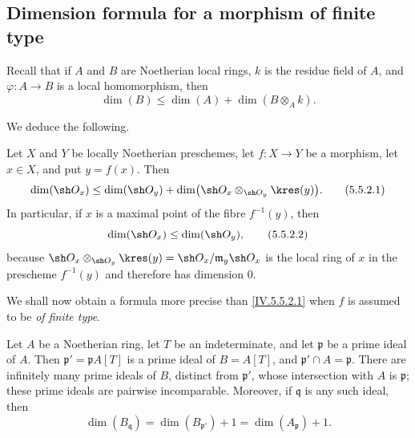 \subsection{Dimension formula for a morphism of finite type}
\label{subsection:IV.5.5}
\label{IV.5.5}

\begin{env}[5.5.1]
\label{IV.5.5.1}


Recall  that if $A$ and $B$ are Noetherian local
rings, $k$ is the residue field of $A$, and
$\varphi:A\to B$ is a local homomorphism, then
\begin{equation}
\dim(B)\leq\dim(A)+\dim(B\otimes_A k).
\tag{5.5.1.1}\label{IV.5.5.1.1}
\end{equation}
\end{env}

We deduce the following.

\begin{proposition}[5.5.2]
\label{IV.5.5.2}
Let $X$ and $Y$ be locally Noetherian preschemes, let
$f:X\to Y$ be a morphism, let $x\in X$, and put $y=f(x)$.
Then
\begin{equation}
\dim(\sh O_x)
 \leq\dim(\sh O_y)
   +\dim\bigl(\sh O_x\otimes_{\sh O_y}\kres(y)\bigr).
\tag{5.5.2.1}\label{IV.5.5.2.1}
\end{equation}
In particular, if $x$ is a maximal point of the fibre $f^{-1}(y)$,
then
\begin{equation}
\dim(\sh O_x)\leq\dim(\sh O_y),
\tag{5.5.2.2}\label{IV.5.5.2.2}
\end{equation}
because $\sh O_x\otimes_{\sh O_y}\kres(y)
=\sh O_x/\mathfrak m_y\sh O_x$
is the local ring of $x$ in the prescheme $f^{-1}(y)$ and therefore
has dimension $0$.
\end{proposition}


We shall now obtain a formula more precise than
\eqref{IV.5.5.2.1} when $f$ is assumed to be \emph{of finite type}.

\begin{proposition}[5.5.3]
\label{IV.5.5.3}
Let $A$ be a Noetherian ring, let $T$ be an indeterminate, and let
$\mathfrak p$ be a prime ideal of $A$.
Then $\mathfrak p'=\mathfrak pA[T]$
is a prime ideal of $B=A[T]$, and
$\mathfrak p'\cap A=\mathfrak p$.
There are infinitely many prime ideals of $B$, distinct from
$\mathfrak p'$, whose intersection with $A$ is $\mathfrak p$; these
prime ideals are pairwise incomparable.
Moreover, if $\mathfrak q$ is any such ideal, then
\begin{equation}
\dim(B_{\mathfrak q})
  =\dim(B_{\mathfrak p'})+1
  =\dim(A_{\mathfrak p})+1.
\tag{5.5.3.1}\label{IV.5.5.3.1}
\end{equation}
\end{proposition}

